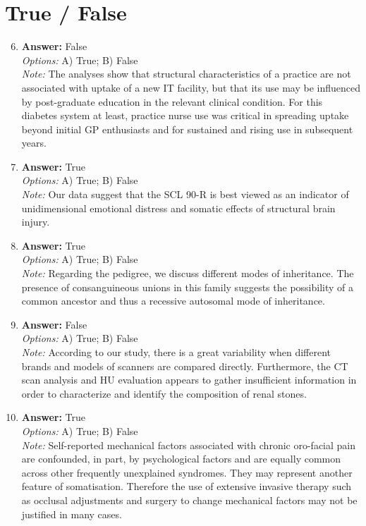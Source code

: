\documentclass[12pt]{article}
\begin{document}
\section*{True / False}
\begin{enumerate}[label=\arabic*.]
\setcounter{enumi}{5}
\item \textbf{Answer:} False
\\ \textit{Options:} A) True; B) False
\\ \textit{Note:} The analyses show that structural characteristics of a practice are not associated with uptake of a new IT facility, but that its use may be influenced by post-graduate education in the relevant clinical condition. For this diabetes system at least, practice nurse use was critical in spreading uptake beyond initial GP enthusiasts and for sustained and rising use in subsequent years.
\item \textbf{Answer:} True
\\ \textit{Options:} A) True; B) False
\\ \textit{Note:} Our data suggest that the SCL 90-R is best viewed as an indicator of unidimensional emotional distress and somatic effects of structural brain injury.
\item \textbf{Answer:} True
\\ \textit{Options:} A) True; B) False
\\ \textit{Note:} Regarding the pedigree, we discuss different modes of inheritance. The presence of consanguineous unions in this family suggests the possibility of a common ancestor and thus a recessive autosomal mode of inheritance.
\item \textbf{Answer:} False
\\ \textit{Options:} A) True; B) False
\\ \textit{Note:} According to our study, there is a great variability when different brands and models of scanners are compared directly. Furthermore, the CT scan analysis and HU evaluation appears to gather insufficient information in order to characterize and identify the composition of renal stones.
\item \textbf{Answer:} True
\\ \textit{Options:} A) True; B) False
\\ \textit{Note:} Self-reported mechanical factors associated with chronic oro-facial pain are confounded, in part, by psychological factors and are equally common across other frequently unexplained syndromes. They may represent another feature of somatisation. Therefore the use of extensive invasive therapy such as occlusal adjustments and surgery to change mechanical factors may not be justified in many cases.
\end{enumerate}
\end{document}
